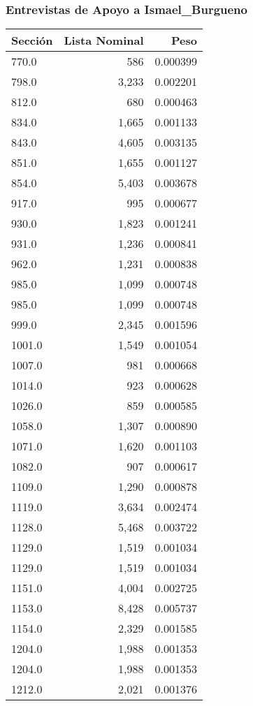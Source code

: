 \documentclass[a4paper,12pt]{article}
\begin{document}
\subsubsection*{Entrevistas de Apoyo a Ismael_Burgueno}
\begin{table}[h]
\centering
\begin{tabular}{lrr}
\toprule
Sección & Lista Nominal & Peso \\ \midrule
770.0 & 586 & 0.000399 \\ 
798.0 & 3,233 & 0.002201 \\ 
812.0 & 680 & 0.000463 \\ 
834.0 & 1,665 & 0.001133 \\ 
843.0 & 4,605 & 0.003135 \\ 
851.0 & 1,655 & 0.001127 \\ 
854.0 & 5,403 & 0.003678 \\ 
917.0 & 995 & 0.000677 \\ 
930.0 & 1,823 & 0.001241 \\ 
931.0 & 1,236 & 0.000841 \\ 
962.0 & 1,231 & 0.000838 \\ 
985.0 & 1,099 & 0.000748 \\ 
985.0 & 1,099 & 0.000748 \\ 
999.0 & 2,345 & 0.001596 \\ 
1001.0 & 1,549 & 0.001054 \\ 
1007.0 & 981 & 0.000668 \\ 
1014.0 & 923 & 0.000628 \\ 
1026.0 & 859 & 0.000585 \\ 
1058.0 & 1,307 & 0.000890 \\ 
1071.0 & 1,620 & 0.001103 \\ 
1082.0 & 907 & 0.000617 \\ 
1109.0 & 1,290 & 0.000878 \\ 
1119.0 & 3,634 & 0.002474 \\ 
1128.0 & 5,468 & 0.003722 \\ 
1129.0 & 1,519 & 0.001034 \\ 
1129.0 & 1,519 & 0.001034 \\ 
1151.0 & 4,004 & 0.002725 \\ 
1153.0 & 8,428 & 0.005737 \\ 
1154.0 & 2,329 & 0.001585 \\ 
1204.0 & 1,988 & 0.001353 \\ 
1204.0 & 1,988 & 0.001353 \\ 
1212.0 & 2,021 & 0.001376 \\ 

\end{tabular}
\end{table}
\end{document}
